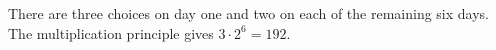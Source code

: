 There are three choices on day one and two on each of the remaining six days. The multiplication principle gives $3\cdot2^6=\boxed{192}$.
